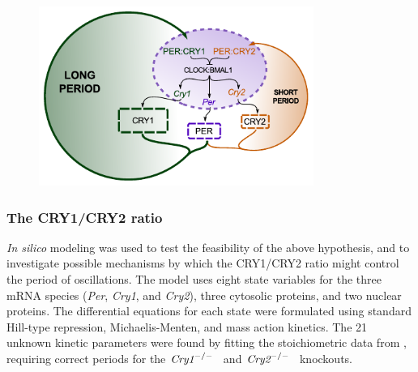 \begin{figure}[bt]
  \centering
  \includegraphics[width=0.8\textwidth]{chap2/figures/twoloops_noopacity.pdf}
   \label{fig:twoloops}
\end{figure}

\subsubsection{The CRY1/CRY2 ratio}
{\it In silico} modeling was used to test the feasibility of the above hypothesis, and to investigate possible mechanisms by which the CRY1/CRY2 ratio might control the period of oscillations. 
The model uses eight state variables for the three mRNA species ({\it Per}, {\it Cry1}, and {\it Cry2}), three cytosolic proteins, and two nuclear proteins. 
The differential equations for each state were formulated using standard Hill-type repression, Michaelis-Menten, and mass action kinetics. 
The 21 unknown kinetic parameters were found by fitting the stoichiometric data from \cite{Lee2001}, requiring correct periods for the $\text{\it Cry1}^{-/-}$  and $\text{\it Cry2}^{-/-}$  knockouts.

